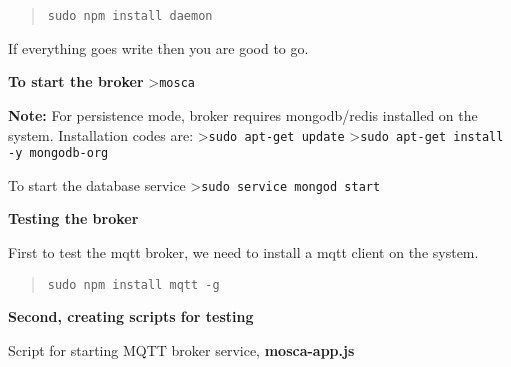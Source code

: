 \documentclass[16pt]{article}
\begin{document}
\begin{quote}
\texttt{sudo npm install daemon}
\end{quote}



If everything goes write then you are good to go.

 \vspace{0.3cm}

\textbf{To start the broker} \textgreater{}\texttt{mosca}

\textbf{Note:} For persistence mode, broker requires mongodb/redis
installed on the system. Installation codes are:
\textgreater{}\texttt{sudo apt-get update}
\textgreater{}\texttt{sudo apt-get install -y mongodb-org}

To start the database service
\textgreater{}\texttt{sudo service mongod start}

 \vspace{0.5cm}

{\Large{\textbf{Testing the broker}}}

First to test the mqtt broker, we need to install a mqtt client on the
system.

\begin{quote}
\texttt{sudo npm install mqtt -g}
\end{quote}

\textbf{Second, creating scripts for testing}

Script for starting MQTT broker service, \textbf{mosca-app.js}



\end{document}
